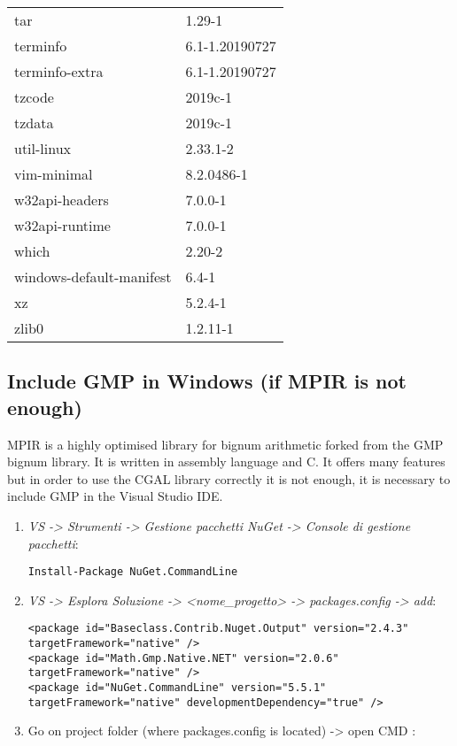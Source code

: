 \documentclass[11pt, english, openany]{report}
\begin{document}
\begin{appendices}
\begin{center}
\begin{tabular}{|m{3cm}|m{3cm}|}
tar & 1.29-1 \\
terminfo & 6.1-1.20190727 \\
terminfo-extra & 6.1-1.20190727 \\
tzcode & 2019c-1 \\
tzdata & 2019c-1 \\
util-linux & 2.33.1-2 \\
vim-minimal & 8.2.0486-1 \\
w32api-headers & 7.0.0-1 \\
w32api-runtime & 7.0.0-1 \\
which & 2.20-2 \\
windows-default-manifest & 6.4-1 \\
xz & 5.2.4-1 \\
zlib0 & 1.2.11-1 \\
\hline
\end{tabular}
\end{center}

\subsection{Include GMP in Windows (if MPIR is not enough)}
MPIR is a highly optimised library for bignum arithmetic forked from the GMP bignum library. It is written in assembly language and C. It offers many features but in order to use the CGAL library correctly it is not enough, it is necessary to include GMP in the Visual Studio IDE.
\begin{enumerate}
\item \textit{VS -> Strumenti -> Gestione pacchetti NuGet -> Console di gestione pacchetti}:
	
\begin{lstlisting}
Install-Package NuGet.CommandLine
\end{lstlisting}	

\item \textit{VS -> Esplora Soluzione -> <nome\_progetto> -> packages.config -> add}: 

\begin{lstlisting}
<package id="Baseclass.Contrib.Nuget.Output" version="2.4.3" targetFramework="native" />
<package id="Math.Gmp.Native.NET" version="2.0.6" targetFramework="native" />
<package id="NuGet.CommandLine" version="5.5.1" targetFramework="native" developmentDependency="true" />
\end{lstlisting}
		

\item Go on project folder (where packages.config is located) -> open CMD :


\end{enumerate}
\end{appendices}
\end{document}

